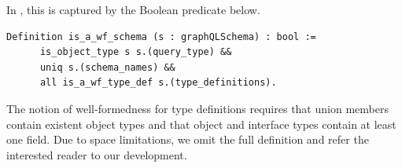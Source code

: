 In \gcoql, this is captured by the Boolean predicate below. %
%
\begin{verbatim}
Definition is_a_wf_schema (s : graphQLSchema) : bool :=
      is_object_type s s.(query_type) &&
      uniq s.(schema_names) &&
      all is_a_wf_type_def s.(type_definitions).
\end{verbatim}
%
The notion of well-formedness for type definitions requires \eg that
union members contain existent object types and that object and
interface types contain at least one field. Due to space limitations,
we omit the full definition and refer the interested reader to our
\coq development. %




